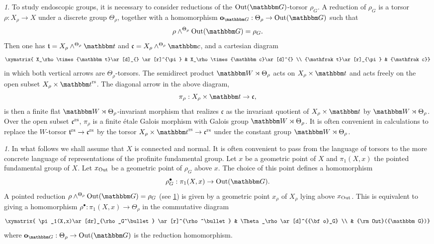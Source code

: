 \documentclass[12pt,english]{smfart}
\numberwithin{equation}{subsection}
\theoremstyle{remark}
\newtheorem{numero}[equation]{}
\newcommand\frakt{{\mathfrak t}}
\newcommand\frakc{{\mathfrak c}}
\newcommand\GG{{\mathbbm G}}
\newcommand\bbW{{\mathbbm W}}
\newcommand\bbt{{\mathbbm t}}
\newcommand\bbc{{\mathbbm c}}
\newcommand\Out{{\rm Out}}
\newcommand\rs{{\rm rs}}
\begin{document}
\begin{numero}\label{reduction}\label{diagramme reduction}\label{pi_rho}
To study endoscopic groups, it is necessary to consider reductions of the $\Out(\GG)$-torsor $\rho_G$. A reduction of $\rho_G$ is a torsor $\rho:X_\rho\rightarrow X$ under a discrete group $\Theta_\rho$, together with a homomorphism ${\bf o}_\GG:\Theta_\rho\rightarrow \Out(\GG)$ such that
$$\rho\wedge^{\Theta_\rho}\Out(\GG)=\rho_G.$$
Then one has $\frakt=X_\rho\wedge^{\Theta_\rho} \bbt$ and $\frakc=X_\rho\wedge^{\Theta_\rho} \bbc$, and a cartesian diagram
$$\xymatrix{
 X_\rho \times\bbt \ar[d]_{} \ar[r]^{\pi}    & X_\rho \times \bbc\ar[d]^{}  \\
 \frakt \ar[r]_{\pi} & \frakc           }$$
in which both vertical arrows are $\Theta_\rho$-torsors. The semidirect product $\bbW\rtimes \Theta_\rho$ acts on $X_\rho\times \bbt$ and acts freely on the open subset $X_\rho\times \bbt^\rs$. The diagonal arrow in the above diagram,
$$\pi_\rho:X_\rho\times \bbt \rightarrow \frakc,$$
is then a finite flat $\bbW\rtimes \Theta_\rho$-invariant morphism that realizes $\frakc$ as the invariant quotient of $X_\rho\times \bbt$ by $\bbW\rtimes \Theta_\rho$. Over the open subset $\frakc^\rs$, $\pi_\rho$ is a finite \'{e}tale Galois morphism with Galois group $\bbW\rtimes \Theta_\rho$. It is often convenient in calculations to replace the $W$-torsor $\frakt^\rs\rightarrow \frakc^\rs$ by the torsor $X_\rho\times \bbt^\rs\rightarrow \frakc^\rs$ under the constant group $\bbW\rtimes \Theta_\rho$.
\end{numero}

\begin{numero}\label{deploiement}
In what follows we shall assume that $X$ is connected and normal. It is often convenient to pass from the language of torsors to the more concrete language of representations of the profinite fundamental group. Let $x$ be a geometric point of $X$ and $\pi_1(X,x)$ the pointed fundamental group of $X$. Let $x_{\rm Out}$ be a geometric point of $\rho_G$ above $x$. The choice of this point defines a homomorphism
$$\rho_G^\bullet:\pi_1(X,x)\rightarrow \Out(\GG).$$
A pointed reduction $\rho\wedge^{\Theta_\rho}\Out(\GG)=\rho_G$ (see \ref{reduction}) is given by a geometric point $x_\rho$ of $X_\rho$ lying above $x_{\rm Out}$. This is equivalent to giving a homomorphism $\rho^\bullet:\pi_1(X,x)\rightarrow \Theta_\rho$ in the commutative diagram
$$\xymatrix{
 \pi_1(X,x)\ar[dr]_{\rho_G^\bullet} \ar[r]^{\rho^\bullet}   & \Theta_\rho \ar[d]^{{\bf o}_G}  \\
 &           \Out(\GG)}$$
where ${\bf o}_\GG:\Theta_\rho\rightarrow \Out(\GG)$ is the reduction homomorphism.
\end{numero}
\end{document}
